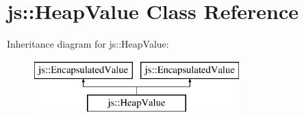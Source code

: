 \hypertarget{classjs_1_1_heap_value}{\section{js\-:\-:Heap\-Value Class Reference}
\label{classjs_1_1_heap_value}
}
Inheritance diagram for js\-:\-:Heap\-Value\-:\begin{figure}[H]
\begin{center}
\leavevmode
\includegraphics[height=2.000000cm]{classjs_1_1_heap_value}
\end{center}
\end{figure}
